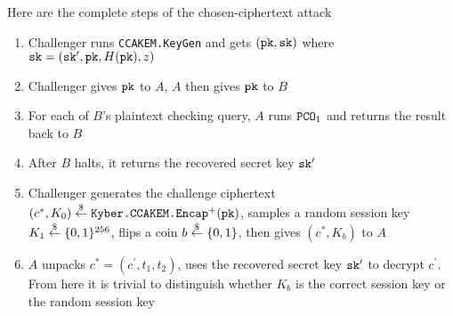 \documentclass{article}
\begin{document}
Here are the complete steps of the chosen-ciphertext attack \begin{enumerate}
    \item Challenger runs \texttt{CCAKEM.KeyGen} and gets $(\texttt{pk}, \texttt{sk})$ where $\texttt{sk} = (\texttt{sk}^\prime, \texttt{pk}, H(\texttt{pk}), z)$
    \item Challenger gives $\texttt{pk}$ to $A$, $A$ then gives $\texttt{pk}$ to $B$
    \item For each of $B$'s plaintext checking query, $A$ runs $\texttt{PCO}_1$ and returns the result back to $B$
    \item After $B$ halts, it returns the recovered secret key $\texttt{sk}^\prime$
    \item Challenger generates the challenge ciphertext $(c^\ast, K_0) \stackrel{\$}{\leftarrow} \texttt{Kyber.CCAKEM.Encap}^+(\texttt{pk})$, samples a random session key $K_1 \stackrel{\$}{\leftarrow} \{0,1\}^{256}$, flips a coin $b \stackrel{\$}{\leftarrow} \{0, 1\}$, then gives $(c^\ast, K_b)$ to $A$
    \item $A$ unpacks $c^\ast = (c^\prime, t_1, t_2)$, uses the recovered secret key $\texttt{sk}^\prime$ to decrypt $c^\prime$. From here it is trivial to distinguish whether $K_b$ is the correct session key or the random session key
\end{enumerate}
\end{document}
